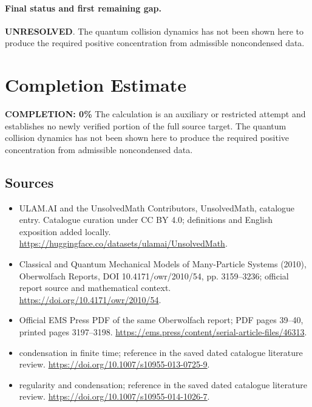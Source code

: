 \documentclass[11pt]{article}
\begin{document}
\paragraph{Final status and first remaining gap.}
\textbf{UNRESOLVED}. The quantum collision dynamics has not been shown here to produce the required positive concentration from admissible noncondensed data.

\section{Completion Estimate}
\noindent\textbf{COMPLETION: 0\%}
The calculation is an auxiliary or restricted attempt and establishes no newly verified portion of the full source target. The quantum collision dynamics has not been shown here to produce the required positive concentration from admissible noncondensed data.

\subsection{Sources}
\begin{itemize}
\item[\hypertarget{source:statement:1}{S1}] ULAM.AI and the UnsolvedMath Contributors, UnsolvedMath, catalogue entry. Catalogue curation under CC BY 4.0; definitions and English exposition added locally.
\url{https://huggingface.co/datasets/ulamai/UnsolvedMath}.
\item[\hypertarget{source:statement:2}{S2}] Classical and Quantum Mechanical Models of Many-Particle Systems (2010), Oberwolfach Reports, DOI 10.4171/owr/2010/54, pp. 3159--3236; official report source and mathematical context.
\url{https://doi.org/10.4171/owr/2010/54}.
\item[\hypertarget{source:statement:3}{S3}] Official EMS Press PDF of the same Oberwolfach report; PDF pages 39--40, printed pages 3197--3198.
\url{https://ems.press/content/serial-article-files/46313}.
\item[\hypertarget{source:statement:4}{S4}] condensation in finite time; reference in the saved dated catalogue literature review.
\url{https://doi.org/10.1007/s10955-013-0725-9}.
\item[\hypertarget{source:statement:5}{S5}] regularity and condensation; reference in the saved dated catalogue literature review.
\url{https://doi.org/10.1007/s10955-014-1026-7}.
\end{itemize}
\label{end:statement}
\end{document}
